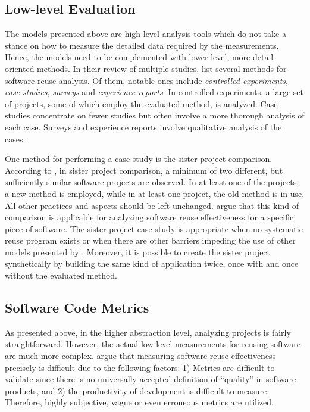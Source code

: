 \subsection{Low-level Evaluation}

The models presented above are high-level analysis tools which do not take a stance on how to measure the detailed data required by the measurements. Hence, the models need to be complemented with lower-level, more detail-oriented methods. In their review of multiple studies, \citet{mohagheghi_quality_2007} list several methods for software reuse analysis. Of them, notable ones include \emph{controlled experiments}, \emph{case studies}, \emph{surveys} and \emph{experience reports}. In controlled experiments, a large set of projects, some of which employ the evaluated method, is analyzed. Case studies concentrate on fewer studies but often involve a more thorough analysis of each case. Surveys and experience reports involve qualitative analysis of the cases. 

One method for performing a case study is the sister project comparison. According to \citet{kitchenham_evaluating_1998}, in sister project comparison, a minimum of two different, but sufficiently similar software projects are observed. In at least one of the projects, a new method is employed, while in at least one project, the old method is in use. All other practices and aspects should be left unchanged. \citet{mohagheghi_quality_2007} argue that this kind of comparison is applicable for analyzing software reuse effectiveness for a specific piece of software. The sister project case study is appropriate when no systematic reuse program exists or when there are other barriers impeding the use of other models presented by \citet{mohagheghi_quality_2007}. Moreover, it is possible to create the sister project synthetically by building the same kind of application twice, once with and once without the evaluated method.

\subsection{Software Code Metrics}

As presented above, in the higher abstraction level, analyzing projects is fairly straightforward. However, the actual low-level measurements for reusing software are much more complex. \citet{mohagheghi_quality_2007} argue that measuring software reuse effectiveness precisely is difficult due to the following factors: 1) Metrics are difficult to validate since there is no universally accepted definition of ``quality'' in software products, and 2) the productivity of development is difficult to measure. Therefore, highly subjective, vague or even erroneous metrics are utilized.

